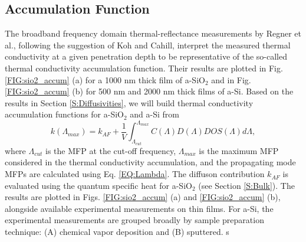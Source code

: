 \documentclass[aps,prb,twocolumn,superscriptaddress,footinbib,amsmath,amssymb,floatfix]{revtex4}
\begin{document}

\subsection{\label{S:Accumulation}Accumulation Function}

The broadband frequency domain thermal-reflectance 
measurements by Regner et al.,\cite{regner_broadband_2013}  
following the suggestion of Koh and Cahill,\cite{koh_frequency_2007} 
interpret the  
measured thermal conductivity at a given penetration depth 
to be representative of the so-called thermal conductivity 
accumulation function.\cite{dames_thermal_2005,yang_mean_2013} 
Their results are plotted in Fig. \ref{FIG:sio2_accum} (a) 
for a 1000 nm thick film of a-SiO$_2$ 
and in Fig. \ref{FIG:sio2_accum} (b) for 500 nm and 
2000 nm thick films of a-Si. 
Based on the results in Section \ref{S:Diffusivities}, we will build 
thermal conductivity accumulation functions for a-SiO$_2$ and a-Si from
\begin{equation}\label{EQ:kLambda}
k(\Lambda_{max}) = k_{AF} + 
\frac{1}{V}\int^{\Lambda_{max}}_{\Lambda_{cut}} 
C(\Lambda) D(\Lambda)DOS(\Lambda)d\Lambda,
\end{equation}
where $\Lambda_{cut}$ is the MFP at the cut-off frequency, 
$\Lambda_{max}$ is the maximum MFP considered in the thermal 
conductivity accumulation, and the propagating mode MFPs are 
calculated using Eq. \eqref{EQ:Lambda}. The 
diffuson contribution $k_{AF}$ is evaluated using the quantum 
specific heat for a-SiO$_2$ (see Section \ref{S:Bulk}). 
The results are plotted 
in Figs. \ref{FIG:sio2_accum} (a) and \ref{FIG:sio2_accum} (b), 
alongside available experimental measurements on thin films. 
For a-Si, the experimental measurements are grouped 
broadly by sample preparation technique: 
(A) chemical vapor deposition
\cite{moon_thermal_2002,liu_high_2009,yang_anomalously_2010}
and 
(B) sputtered.
\cite{kuo_thermal_1992,cahill_thermal_1994,wada_thermal_1996} s
\end{document}
